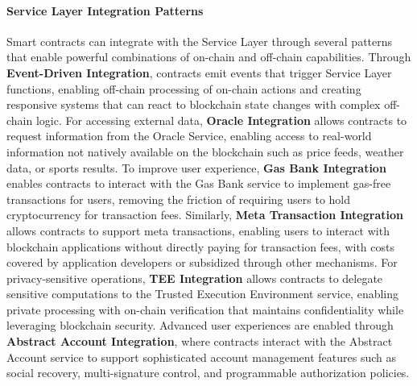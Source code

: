 \documentclass[11pt]{article}
\begin{document}
\paragraph{Service Layer Integration Patterns}
Smart contracts can integrate with the Service Layer through several patterns that enable powerful combinations of on-chain and off-chain capabilities. Through \textbf{Event-Driven Integration}, contracts emit events that trigger Service Layer functions, enabling off-chain processing of on-chain actions and creating responsive systems that can react to blockchain state changes with complex off-chain logic. For accessing external data, \textbf{Oracle Integration} allows contracts to request information from the Oracle Service, enabling access to real-world information not natively available on the blockchain such as price feeds, weather data, or sports results. To improve user experience, \textbf{Gas Bank Integration} enables contracts to interact with the Gas Bank service to implement gas-free transactions for users, removing the friction of requiring users to hold cryptocurrency for transaction fees. Similarly, \textbf{Meta Transaction Integration} allows contracts to support meta transactions, enabling users to interact with blockchain applications without directly paying for transaction fees, with costs covered by application developers or subsidized through other mechanisms. For privacy-sensitive operations, \textbf{TEE Integration} allows contracts to delegate sensitive computations to the Trusted Execution Environment service, enabling private processing with on-chain verification that maintains confidentiality while leveraging blockchain security. Advanced user experiences are enabled through \textbf{Abstract Account Integration}, where contracts interact with the Abstract Account service to support sophisticated account management features such as social recovery, multi-signature control, and programmable authorization policies.
\end{document}
